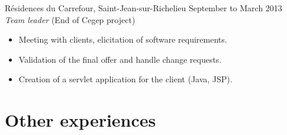 \documentclass{res}
\newcommand{\inFrench}[1]{}
\newcommand{\inEnglish}[1]{#1}
\begin{document}
\begin{resume}
{	%


	Résidences du Carrefour, Saint-Jean-sur-Richelieu
	\hfill September to March 2013 \\
	{\sl Team leader} \hfill (End of Cegep project)
	\vspace{0.05in}

	\begin{itemize} \itemsep -2pt
		\item Meeting with clients, elicitation of software requirements.
		\item Validation of the final offer and handle change requests.
		\item Creation of a servlet application for the client (Java, JSP).
	\end{itemize}
}

\inFrench{
	\section{Expériences connexes}
}
\inEnglish{
	\section{Other experiences}
}
\vspace{6pt}

\inFrench{
	{\sl Chef d'équipe, secteur restauration}
		\hfill mai à août 2011, 2012 et 2013 \\
	Parc d'attractions La Ronde

}
\end{resume}
\end{document}
